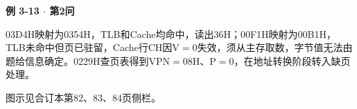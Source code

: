{\color{ink}\bfseries 例 3-13 \(\cdot \) 第2问}\par\vspace{1bp}03D4H映射为0354H，TLB和Cache均命中，读出36H；00F1H映射为00B1H，TLB未命中但页已驻留，Cache行CH因V\(=\allowbreak{}\)0失效，须从主存取数，字节值无法由题给信息确定。0229H查页表得到VPN\(=\allowbreak{}\)08H、P\(=\allowbreak{}\)0，在地址转换阶段转入缺页处理。\par {\color{ink}图示见合订本第82、83、84页侧栏。}
